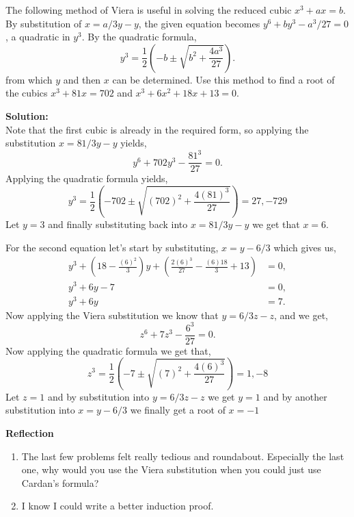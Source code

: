 \documentclass[12pt]{article}
\makeatletter
\theoremstyle{homework}
\newenvironment{exercise}[1]
{\def\@currentlabel{#1}\exercisecore}
{\endexercisecore}
\newcommand{\localhead}[1]{\par\smallskip\noindent\textbf{#1}\nobreak\\}%
\newcommand\solution{\localhead{Solution:}}
\makeatother
\begin{document}
\begin{exercise}{12} The following method of Viera is useful in solving the reduced cubic
  $x^3 + ax = b$. By substitution of $x = a/3y - y$, the given equation becomes $y^6 + by^3 - a^3/27 = 0$,
  a quadratic in $y^3$. By the quadratic formula, 
  \begin{equation*}
    y^3 = \frac{1}{2}(-b \pm \sqrt{b^2 + \frac{4a^3}{27}}).
  \end{equation*}
  from which $y$ and then $x$ can be determined. Use this method to find a root of the cubics $x^3 + 81x = 702$
  and $x^3 + 6x^2 + 18x + 13 = 0$.
  \solution Note that the first cubic is already in the required form, so applying the substitution $x = 81/3y - y$ yields,
  \begin{equation*}
    y^6 + 702y^3 - \frac{81^3}{27} = 0.
  \end{equation*}
  Applying the quadratic formula yields, 
  \begin{equation*}
    y^3 = \frac{1}{2}(-702 \pm \sqrt{(702)^2 + \frac{4(81)^3}{27}}) = 27,-729
  \end{equation*}
  Let $y = 3$ and finally substituting back into $x = 81/3y - y$ we get that $x = 6$. 

  \vspace{.25in}

  For the second equation let's start by substituting, $x = y - 6/3$ which gives us, 
  \begin{align*}
    y^3 + (18 - \frac{(6)^2}{3})y + (\frac{2(6)^3}{27} - \frac{(6)18}{3} + 13) &= 0,\\
    y^3 + 6y -7 &= 0,\\
    y^3 + 6y &= 7.
  \end{align*}
  Now applying the Viera substitution we know that $y = 6/3z - z$, and we get, 
  \begin{equation*}
    z^6 + 7z^3 - \frac{6^3}{27} = 0.
  \end{equation*}
  Now applying the quadratic formula we get that, 
  \begin{equation*}
    z^3 = \frac{1}{2}(-7 \pm \sqrt{(7)^2 + \frac{4(6)^3}{27}}) = 1, -8
  \end{equation*}
  Let $z = 1$ and by substitution into $y = 6/3z - z$ we get $y = 1$ and by another substitution into 
  $x = y - 6/3$ we finally get a root of $x = -1$
\end{exercise}
\vspace{.5in}



\textbf{Reflection}
\begin{enumerate}
  \item The last few problems felt really tedious and roundabout. Especially the last one, why would you use the Viera substitution when 
  you could just use Cardan's formula?
  \item I know I could write a better induction proof. 
\end{enumerate}
\end{document}
